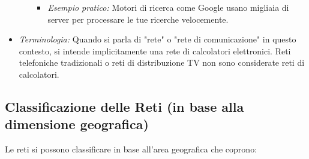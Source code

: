 \begin{itemize}
\begin{enumerate}
\begin{itemize}
            \item \textit{Esempio pratico:} Motori di ricerca come Google usano migliaia di server per processare le tue ricerche velocemente.
        \end{itemize}
    \end{enumerate}
    \item \textit{Terminologia:} Quando si parla di "rete" o "rete di comunicazione" in questo contesto, si intende implicitamente una rete di calcolatori elettronici. Reti telefoniche tradizionali o reti di distribuzione TV non sono considerate reti di calcolatori.
\end{itemize}

\subsection{Classificazione delle Reti (in base alla dimensione geografica)}
Le reti si possono classificare in base all'area geografica che coprono:
